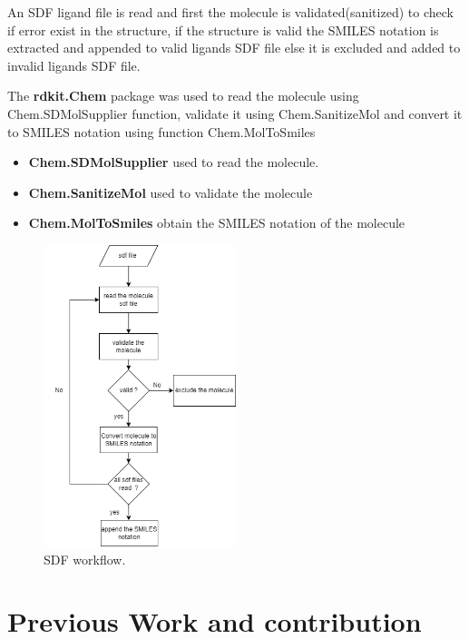 \documentclass[11pt, a4paper]{article}
\begin{document}
        An SDF ligand file is read and first the molecule is validated(sanitized) to check if error exist in the structure, if the structure is valid the SMILES notation
        is extracted and appended to valid ligands SDF file else it is excluded and added to invalid ligands SDF file.

        The \textbf{rdkit.Chem} package \cite{7} was used to read the molecule using Chem.SDMolSupplier function, validate it using Chem.SanitizeMol and convert it to SMILES notation
        using function Chem.MolToSmiles

        \begin{itemize}
            \item \textbf{Chem.SDMolSupplier} used to read the molecule.
            \item \textbf{Chem.SanitizeMol} used to validate the molecule             
            \item \textbf{Chem.MolToSmiles} obtain the SMILES notation of the molecule 
        \end{itemize}

        \begin{figure}[H]
            \centering
            \includegraphics[width=0.5\textwidth]{sdf parser.png} %
            \caption{SDF workflow.}
            \label{fig 7}
        \end{figure}

        \section{Previous Work and contribution}
\end{document}
